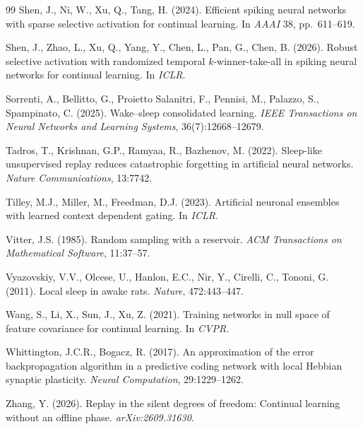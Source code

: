 \documentclass{article}
\begin{document}
\begin{thebibliography}{99}
 Shen, J., Ni, W., Xu, Q., Tang, H. (2024). Efficient spiking neural networks with sparse selective activation for continual learning. In \emph{AAAI} 38, pp.\ 611--619.

 Shen, J., Zhao, L., Xu, Q., Yang, Y., Chen, L., Pan, G., Chen, B. (2026). Robust selective activation with randomized temporal $k$-winner-take-all in spiking neural networks for continual learning. In \emph{ICLR}.

 Sorrenti, A., Bellitto, G., Proietto Salanitri, F., Pennisi, M., Palazzo, S., Spampinato, C. (2025). Wake--sleep consolidated learning. \emph{IEEE Transactions on Neural Networks and Learning Systems}, 36(7):12668--12679.

 Tadros, T., Krishnan, G.P., Ramyaa, R., Bazhenov, M. (2022). Sleep-like unsupervised replay reduces catastrophic forgetting in artificial neural networks. \emph{Nature Communications}, 13:7742.

 Tilley, M.J., Miller, M., Freedman, D.J. (2023). Artificial neuronal ensembles with learned context dependent gating. In \emph{ICLR}.

 Vitter, J.S. (1985). Random sampling with a reservoir. \emph{ACM Transactions on Mathematical Software}, 11:37--57.

 Vyazovskiy, V.V., Olcese, U., Hanlon, E.C., Nir, Y., Cirelli, C., Tononi, G. (2011). Local sleep in awake rats. \emph{Nature}, 472:443--447.

 Wang, S., Li, X., Sun, J., Xu, Z. (2021). Training networks in null space of feature covariance for continual learning. In \emph{CVPR}.

 Whittington, J.C.R., Bogacz, R. (2017). An approximation of the error backpropagation algorithm in a predictive coding network with local Hebbian synaptic plasticity. \emph{Neural Computation}, 29:1229--1262.

 Zhang, Y. (2026). Replay in the silent degrees of freedom: Continual learning without an offline phase. \emph{arXiv:2609.31630}.

\end{thebibliography}

\clearpage
\appendix
\end{document}
